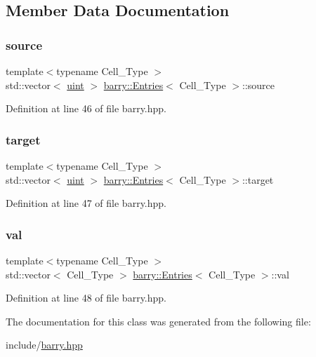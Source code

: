 \subsection{Member Data Documentation}
\mbox{\label{classbarry_1_1_entries_a5992282ca5f39dbbbd4195d7176b6295}} 
\subsubsection{\texorpdfstring{source}{source}}
{\footnotesize\ttfamily template$<$typename Cell\+\_\+\+Type $>$ \\
std\+::vector$<$ \hyperlink{namespacebarry_a11dfc53ddb4672278319aa04f1e09a6c}{uint} $>$ \hyperlink{classbarry_1_1_entries}{barry\+::\+Entries}$<$ Cell\+\_\+\+Type $>$\+::source}



Definition at line 46 of file barry.\+hpp.

\mbox{\label{classbarry_1_1_entries_a07de39535af23bc1f9e3918b32a39b18}} 
\subsubsection{\texorpdfstring{target}{target}}
{\footnotesize\ttfamily template$<$typename Cell\+\_\+\+Type $>$ \\
std\+::vector$<$ \hyperlink{namespacebarry_a11dfc53ddb4672278319aa04f1e09a6c}{uint} $>$ \hyperlink{classbarry_1_1_entries}{barry\+::\+Entries}$<$ Cell\+\_\+\+Type $>$\+::target}



Definition at line 47 of file barry.\+hpp.

\mbox{\label{classbarry_1_1_entries_af2570fcd2f42e9a1704f9c254507284c}} 
\subsubsection{\texorpdfstring{val}{val}}
{\footnotesize\ttfamily template$<$typename Cell\+\_\+\+Type $>$ \\
std\+::vector$<$ Cell\+\_\+\+Type $>$ \hyperlink{classbarry_1_1_entries}{barry\+::\+Entries}$<$ Cell\+\_\+\+Type $>$\+::val}



Definition at line 48 of file barry.\+hpp.



The documentation for this class was generated from the following file\+:\begin{DoxyCompactItemize}
\item 
include/\hyperlink{barry_8hpp}{barry.\+hpp}\end{DoxyCompactItemize}
